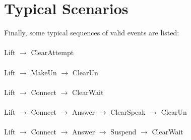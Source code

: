 \documentclass{article}
\begin{document}


\section{Typical Scenarios}
Finally, some typical sequences of valid events are listed:\\ \\
Lift $\longrightarrow$ ClearAttempt \\
\\
Lift $\longrightarrow$ MakeUn $\longrightarrow$ ClearUn \\
\\
Lift $\longrightarrow$ Connect $\longrightarrow$ ClearWait\\
\\
Lift $\longrightarrow$ Connect $\longrightarrow$ Answer $\longrightarrow$ ClearSpeak $\longrightarrow$ ClearUn\\
\\
Lift $\longrightarrow$ Connect $\longrightarrow$ Answer $\longrightarrow$ Suspend $\longrightarrow$ ClearWait


\end{document}
